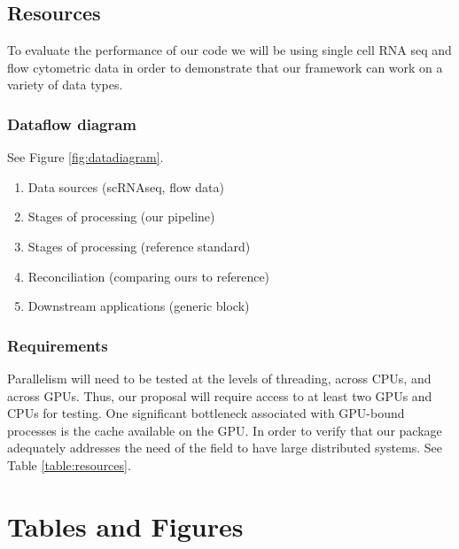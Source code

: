 \documentclass[11pt,letterpaper]{article}
\providecommand{\tightlist}{%
  \setlength{\itemsep}{0pt}\setlength{\parskip}{0pt}}
\begin{document}
\subsection{Resources}


To evaluate the performance of our code we will be using single cell RNA seq and flow cytometric data in order to demonstrate that our framework can work on a variety of data types.

\subsubsection{Dataflow diagram}
See Figure \ref{fig:datadiagram}.
\begin{enumerate} \tightlist
\item Data sources (scRNAseq, flow data)
\item Stages of processing (our pipeline)
\item Stages of processing (reference standard)
\item Reconciliation (comparing ours to reference)
\item Downstream applications (generic block)
\end{enumerate}

\subsubsection{Requirements}

Parallelism will need to be tested at the levels of threading, across
CPUs, and across GPUs. Thus, our proposal will require access to at
least two GPUs and CPUs for testing. One significant bottleneck
associated with GPU-bound processes is the cache available on the
GPU. In order to verify that our package adequately addresses the need
of the field to have large distributed systems. See Table
\ref{table:resources}.

\appendix
\section{Tables and Figures}
\end{document}
